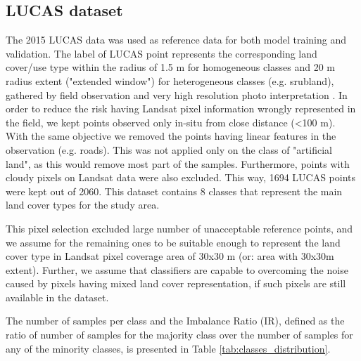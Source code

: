\documentclass[remotesensing,article,submit,moreauthors,pdftex]{Definitions/mdpi}
\begin{document}
\subsection{LUCAS dataset}

The 2015 LUCAS data was used as reference data for both model training and
validation. The label of LUCAS point represents the corresponding land cover/use
type within the radius of 1.5 m for homogeneous classes and 20 m radius extent 
("extended window") for heterogeneous classes (e.g. srubland), gathered  by 
field observation and very high resolution photo interpretation  
\cite{LUCAS2015C1}. In order to reduce the risk having Landsat pixel 
information wrongly represented in the field, we kept points observed only 
in-situ from close distance (<100 m). With the same objective we removed the 
points having linear features in the observation (e.g. roads). This was not 
applied only on the class of "artificial land", as this would remove most part 
of the samples. Furthermore, points with cloudy pixels on Landsat data were 
also excluded. This way, 1694 LUCAS points were kept out of 2060. This dataset 
contains 8 classes that represent the main land cover types for the study area.

This pixel selection excluded large number of unacceptable reference points, and
we assume for the remaining ones to be suitable enough to represent the land
cover type in Landsat pixel coverage area of 30x30 m (or: area with 30x30m
extent). Further, we assume that classifiers are capable to overcoming the
noise caused by pixels having mixed land cover representation, if such pixels
are still available in the dataset.

The number of samples per class and the Imbalance Ratio (IR), defined as the
ratio of number of samples for the majority class over the number of samples for
any of the minority classes, is presented in Table
\ref{tab:classes_distribution}.
\end{document}
